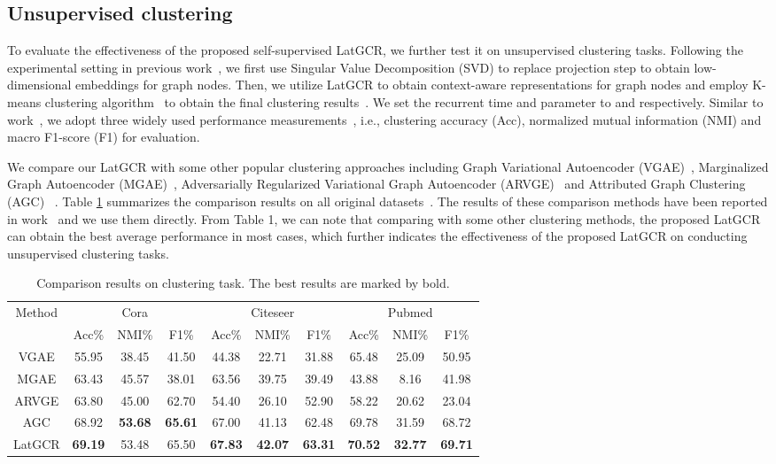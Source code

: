 \documentclass{article}
\begin{document}
\subsection{Unsupervised clustering}

To evaluate the effectiveness of the proposed self-supervised LatGCR, we further test it on
unsupervised clustering tasks.
Following the experimental setting in previous work~\cite{AGCN},
we first use Singular Value Decomposition (SVD) to replace projection step to obtain low-dimensional embeddings  for graph nodes.
Then, we utilize LatGCR to obtain context-aware representations for graph nodes and employ K-means clustering algorithm~\cite{cluster} to obtain the final clustering results~\cite{AGCN}.
We set the recurrent time and parameter  to  and  respectively.
Similar to work~\cite{AGCN}, we adopt three widely used performance measurements~\cite{cluster}, i.e., clustering accuracy (Acc), normalized mutual information (NMI) and macro F1-score (F1) for evaluation.

We compare our LatGCR with some other popular clustering approaches including Graph Variational Autoencoder (VGAE)~\cite{GAE}, Marginalized Graph Autoencoder (MGAE)~\cite{MGAE}, Adversarially Regularized Variational Graph Autoencoder (ARVGE)~\cite{ARGE} and Attributed Graph Clustering (AGC) ~\cite{AGCN}.
Table \ref{tab:result-cluster} summarizes the comparison results on all original datasets~\cite{sen2008collective}.
The results of these comparison methods have been reported in work~\cite{AGCN} and we use them directly.
From Table 1, we can note that comparing with some other clustering methods, the proposed LatGCR can obtain the best average performance in most cases,
which further indicates the effectiveness of the proposed LatGCR on conducting unsupervised clustering tasks.
\begin{table}[!htpb]
\centering
\caption{\upshape Comparison results on clustering task. The best results are marked by bold.}
\label{tab:result-cluster}
\small
\renewcommand\arraystretch{1.1}
\begin{tabular}{c|ccc|ccc|ccc}
  \hline
  \hline
   \multirow{2}{*}{Method}& \multicolumn{3}{c|}{Cora}& \multicolumn{3}{c|}{Citeseer}& \multicolumn{3}{c}{Pubmed}\\
  \cline{2-10}
 &Acc\%&NMI\%&F1\% &Acc\%&NMI\%&F1\% &Acc\%&NMI\%&F1\%   \\
  \hline
   VGAE      & 55.95&38.45&41.50&44.38&22.71&31.88&65.48&25.09&50.95\\
   MGAE      & 63.43&45.57&38.01&63.56&39.75&39.49&43.88&8.16&41.98\\
   ARVGE     & 63.80&45.00&62.70&54.40&26.10&52.90&58.22&20.62&23.04\\
   AGC       & 68.92&\textbf{53.68}&\textbf{65.61}&67.00&41.13&62.48&69.78&31.59&68.72\\
   \hline
   LatGCR    & \textbf{69.19}&53.48&65.50 & \textbf{67.83}&\textbf{42.07}&\textbf{63.31} & \textbf{70.52}&\textbf{32.77}&\textbf{69.71}\\
  \hline
  \hline
\end{tabular}
\end{table}
\end{document}
